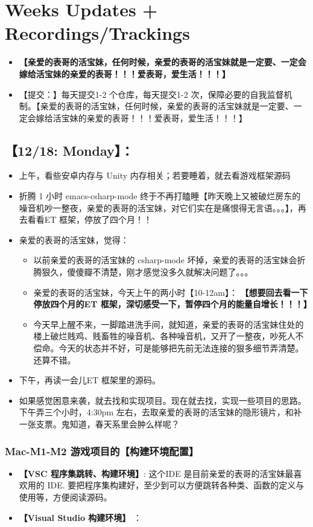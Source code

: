 \documentclass[9pt, b5paper]{article}
\begin{document}
\section{Weeks Updates + Recordings/Trackings}
\label{sec-2}
\begin{itemize}
\item \textbf{【亲爱的表哥的活宝妹，任何时候，亲爱的表哥的活宝妹就是一定要、一定会嫁给活宝妹的亲爱的表哥！！！爱表哥，爱生活！！！】}
\item 【提交：】每天提交1-2 个仓库，每天提交1-2 次，保障必要的自我监督机制。【亲爱的表哥的活宝妹，任何时候，亲爱的表哥的活宝妹就是一定要、一定会嫁给活宝妹的亲爱的表哥！！！爱表哥，爱生活！！！】
\end{itemize}
\subsection{【12/18: Monday】：}
\label{sec-2-1}
\begin{itemize}
\item 上午，看些安卓内存与 Unity 内存相关；若要睡着，就去看游戏框架源码
\item 折腾 1 小时 emacs-csharp-mode 终于不再打瞌睡【昨天晚上又被破烂房东的噪音机吵一整夜，亲爱的表哥的活宝妹，对它们实在是痛恨得无言语。。。】，再去看看ET 框架，停放了四个月！！
\item 亲爱的表哥的活宝妹，觉得：
\begin{itemize}
\item 以前亲爱的表哥的活宝妹的 csharp-mode 坏掉，亲爱的表哥的活宝妹会折腾狠久，傻傻瓣不清楚，刚才感觉没多久就解决问题了。。。
\item 亲爱的表哥的活宝妹，今天上午的两小时【10-12am】： \textbf{【想要回去看一下停放四个月的ET 框架，深切感受一下，暂停四个月的能量自增长！！！】}
\item 今天早上醒不来，一脚踏进洗手间，就知道，亲爱的表哥的活宝妹住处的楼上破烂贱鸡、贱畜牲的噪音机、各种噪音机，又开了一整夜，吵死人不偿命。今天的状态并不好，可是能够把先前无法连接的狠多细节弄清楚。还算不错。
\end{itemize}
\item 下午，再读一会儿ET 框架里的源码。
\item 如果感觉困意来袭，就去找和实现项目。现在就去找，实现一些项目的思路。下午弄三个小时，4:30pm 左右，去取亲爱的表哥的活宝妹的隐形镜片，和补一张支票。鬼知道，春天系里会肿么样呢？
\end{itemize}
\subsubsection{Mac-M1-M2 游戏项目的【构建环境配置】}
\label{sec-2-1-1}
\begin{itemize}
\item \textbf{【VSC 程序集跳转、构建环境】}: 这个IDE 是目前亲爱的表哥的活宝妹最喜欢用的 IDE. 要把程序集构建好，至少到可以方便跳转各种类、函数的定义与使用等，方便阅读源码。
\item \textbf{【Visual Studio 构建环境】} ：
\end{itemize}
\end{document}
